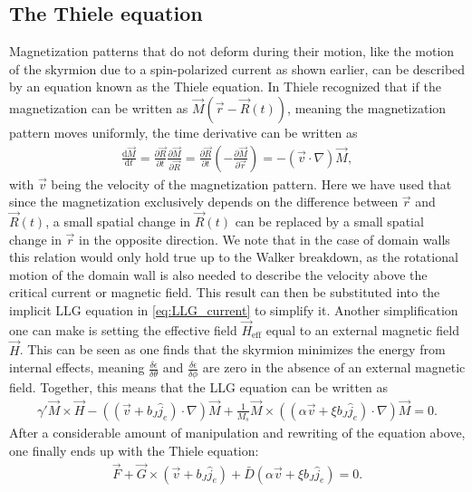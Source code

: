 \documentclass[12pt, a4paper, twoside, openright]{article}		%
\numberwithin{equation}{section}
\begin{document}
\subsection{The Thiele equation}
Magnetization patterns that do not deform during their motion, like the motion of the skyrmion due to a spin-polarized current as shown earlier, can be described by an equation known as the Thiele equation. In \cite{Thiele1973} Thiele recognized that if the magnetization can be written as $\vec{M}(\vec{r}-\vec{R}(t))$, meaning the magnetization pattern moves uniformly, the time derivative can be written as
\begin{align}
\label{eq:ThieleRelation}
\frac{\textrm{d} \vec{M}}{\textrm{d} t} = \frac{\partial \vec{R}}{\partial t}\frac{\partial \vec{M}}{\partial \vec{R}} = \frac{\partial \vec{R}}{\partial t} (-\frac{\partial \vec{M}}{\partial \vec{r}}) = -(\vec{v}\cdot\nabla)\vec{M},
\end{align}
with $\vec{v}$ being the velocity of the magnetization pattern. Here we have used that since the magnetization exclusively depends on the difference between $\vec{r}$ and $\vec{R}(t)$, a small spatial change in $\vec{R}(t)$ can be replaced by a small spatial change in $\vec{r}$ in the opposite direction. We note that in the case of domain walls this relation would only hold true up to the Walker breakdown, as the rotational motion of the domain wall is also needed to describe the velocity above the critical current or magnetic field. This result can then be substituted into the implicit LLG equation in \eqref{eq:LLG_current} to simplify it. 
Another simplification one can make is setting the effective field $\vec{H}_{\text{eff}}$ equal to an external magnetic field $\vec{H}$. This can be seen as one finds that the skyrmion minimizes the energy from internal effects, meaning $\frac{\delta\epsilon}{\delta\theta}$ and $\frac{\delta\epsilon}{\delta\phi}$ are zero in the absence of an external magnetic field. Together, this means that the LLG equation can be written as
\begin{align}
\gamma'\vec{M}\times\vec{H} - ((\vec{v}+b_J\hat{j}_e)\cdot\nabla)\vec{M} + \frac{1}{M_s}\vec{M}\times((\alpha\vec{v}+\xi b_J\hat{j}_e)\cdot\nabla)\vec{M} = 0.
\end{align}
After a considerable amount of manipulation and rewriting of the equation above, one finally ends up with the Thiele equation:
\begin{align}
\label{eq:Thiele}
\vec{F} + \vec{G}\times(\vec{v}+b_J\hat{j}_e) + \bar{D}(\alpha\vec{v}+\xi b_J\hat{j}_e) = 0.
\end{align}
\end{document}
